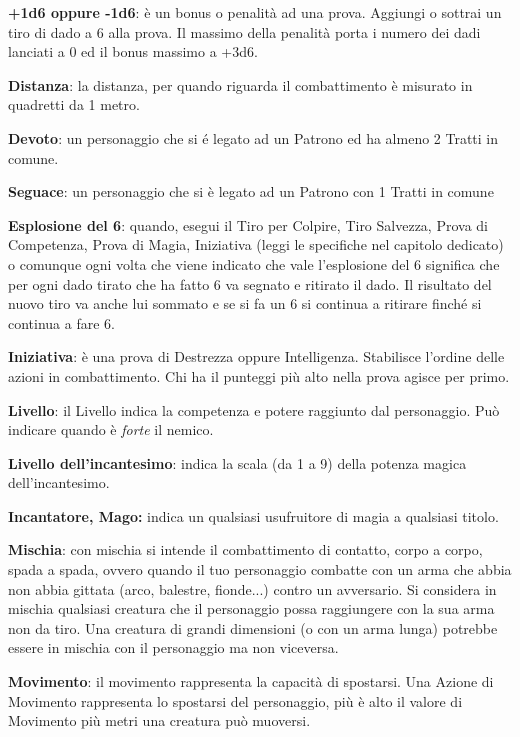 \begin{multicols}{2}
\textbf{+1d6 oppure -1d6}: è un bonus o penalità ad una prova. Aggiungi o sottrai un tiro di dado a 6 alla prova. Il massimo della penalità porta i numero dei dadi lanciati a 0 ed il bonus massimo a +3d6.

\textbf{Distanza}: la distanza, per quando riguarda il combattimento è misurato in quadretti da 1 metro.

\textbf{Devoto}: un personaggio che si é legato ad un Patrono ed ha almeno 2 Tratti in comune.

\textbf{Seguace}: un personaggio che si è legato ad un Patrono con 1 Tratti in comune

\textbf{Esplosione del 6}: quando, esegui il Tiro per Colpire, Tiro Salvezza, Prova di Competenza, Prova di Magia, Iniziativa (leggi le specifiche nel capitolo dedicato) o comunque ogni volta che viene indicato che vale l'esplosione del 6 significa che per ogni dado tirato che ha fatto 6 va segnato e ritirato il dado. Il risultato del nuovo tiro va anche lui sommato e se si fa un 6 si continua a ritirare finché si continua a fare 6.

\textbf{Iniziativa}: è una prova di Destrezza oppure Intelligenza. Stabilisce l'ordine delle azioni in combattimento. Chi ha il punteggi più alto nella prova agisce per primo.

\textbf{Livello}: il Livello indica la competenza e potere raggiunto dal personaggio. Può indicare quando è \emph{forte} il nemico.

\textbf{Livello dell'incantesimo}: indica la scala (da 1 a 9) della potenza magica dell'incantesimo.

\textbf{Incantatore, Mago:} indica un qualsiasi usufruitore di magia a qualsiasi titolo.

\textbf{Mischia}: con mischia si intende il combattimento di contatto, corpo a corpo, spada a spada, ovvero quando il tuo personaggio combatte con un arma che abbia non abbia gittata (arco, balestre, fionde...) contro un avversario.
Si considera in mischia qualsiasi creatura che il personaggio possa raggiungere con la sua arma non da tiro. Una creatura di grandi dimensioni (o con un arma lunga) potrebbe essere in mischia con il personaggio ma non viceversa.

\textbf{Movimento}: il movimento rappresenta la capacità di spostarsi. Una Azione di Movimento rappresenta lo spostarsi del personaggio, più è alto il valore di Movimento più metri una creatura può muoversi.


\end{multicols}
